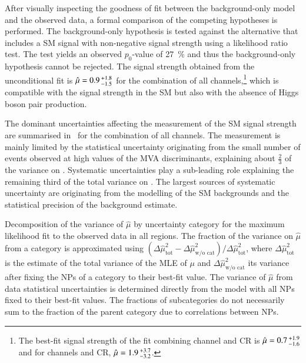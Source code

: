 
After visually inspecting the goodness of fit between the background-only model
and the observed data, a formal comparison of the competing hypotheses is
performed. The background-only hypothesis is tested against the alternative that
includes a SM \HH signal with non-negative signal strength using a likelihood
ratio test. The test yields an observed $p_0$-value of \SI{27}{\percent} and
thus the background-only hypothesis cannot be rejected.
The signal strength obtained from the unconditional fit is
$\hat{\mu} = 0.9\,\numpmerr{+1.8}{-1.5}$ for the combination of all
channels,\footnote{The best-fit signal strength of the fit combining \hadhad
  channel and CR is $\hat{\mu} = 0.7\,\numpmerr{+1.9}{-1.6}$ and for \lephad
  channels and CR, $\hat{\mu} = 1.9\,\numpmerr{+3.7}{-3.2}$.}  which is
compatible with the signal strength in the SM but also with the absence of Higgs
boson pair production.

The dominant uncertainties affecting the measurement of the SM \HH signal
strength are summarised in~ for the combination of
all channels. The measurement is mainly limited by the statistical uncertainty
originating from the small number of events observed at high values of the MVA
discriminants, explaining about $\frac{2}{3}$ of the variance on
\muhat. Systematic uncertainties play a sub-leading role explaining the
remaining third of the total variance on \muhat. The largest sources of
systematic uncertainty are originating from the modelling of the SM backgrounds
and the statistical precision of the background estimate.

\begin{table}[htbp]
  \centering

  \caption{Decomposition of the variance of $\hat{\mu}$ by uncertainty category
    for the maximum likelihood fit to the observed data in all regions. The
    fraction of the variance on $\hat{\mu}$ from a category is approximated
    using
    $(\Delta\hat{\mu}^2_{\text{tot}} - \Delta\hat{\mu}^2_{\text{w/o cat}}) /
    \Delta \hat{\mu}^2_{\text{tot}}$, where $\Delta\hat{\mu}^2_{\text{tot}}$ is
    the estimate of the total variance of the MLE of $\mu$ and
    $\Delta\hat{\mu}^2_{\text{w/o cat}}$ its variance after fixing the NPs of a
    category to their best-fit value. The variance of $\hat{\mu}$ from data
    statistical uncertainties is determined directly from the model with all NPs
    fixed to their best-fit values. The fractions of subcategories do not
    necessarily sum to the fraction of the parent category due to correlations
    between NPs.}

  

  \label{tab:breakdown_nonres}
\end{table}

